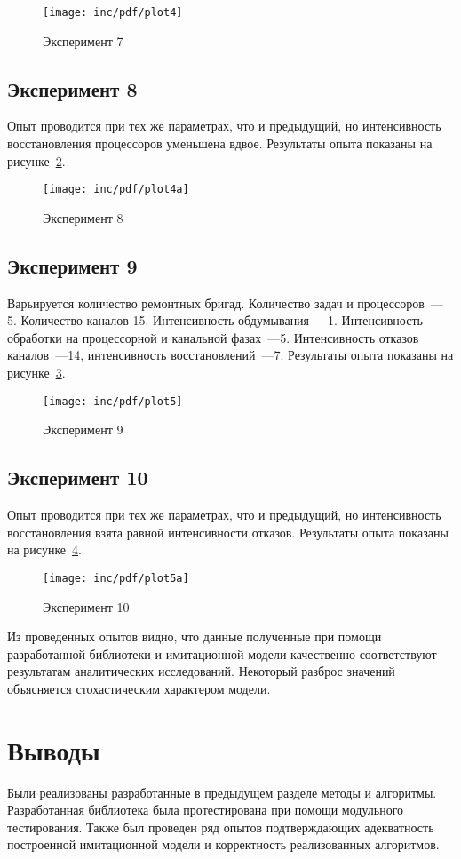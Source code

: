 \begin{figure}[ht!]
  \centering
  \texttt{[image: inc/pdf/plot4]}
  \caption{Эксперимент 7}
  \label{fig:plot4}
\end{figure}

\subsection*{Эксперимент 8}

Опыт проводится при тех же параметрах, что и предыдущий, но интенсивность восстановления процессоров уменьшена вдвое. Результаты опыта показаны на рисунке~\ref{fig:plot4a}.

\begin{figure}[ht!]
  \centering
  \texttt{[image: inc/pdf/plot4a]}
  \caption{Эксперимент 8}
  \label{fig:plot4a}
\end{figure}

\subsection*{Эксперимент 9}

Варьируется количество ремонтных бригад. Количество задач и процессоров~--- 5. Количество каналов 15. Интенсивность обдумывания~---1. Интенсивность обработки на процессорной и канальной фазах~---5. Интенсивность отказов каналов~---14, интенсивность восстановлений~---7. Результаты опыта показаны на рисунке~\ref{fig:plot5}.

\begin{figure}[ht!]
  \centering
  \texttt{[image: inc/pdf/plot5]}
  \caption{Эксперимент 9}
  \label{fig:plot5}
\end{figure}

\subsection*{Эксперимент 10}

Опыт проводится при тех же параметрах, что и предыдущий, но интенсивность восстановления взята равной интенсивности отказов. Результаты опыта показаны на рисунке~\ref{fig:plot5a}.

\begin{figure}[ht!]
  \centering
  \texttt{[image: inc/pdf/plot5a]}
  \caption{Эксперимент 10}
  \label{fig:plot5a}
\end{figure}

Из проведенных опытов видно, что данные полученные при помощи разработанной библиотеки и имитационной модели качественно соответствуют результатам аналитических исследований. Некоторый разброс значений объясняется стохастическим характером модели.

\section{Выводы}

Были реализованы разработанные в предыдущем разделе методы и алгоритмы. Разработанная библиотека была протестирована при помощи модульного тестирования. Также был проведен ряд опытов подтверждающих адекватность построенной имитационной модели и корректность реализованных алгоритмов.
